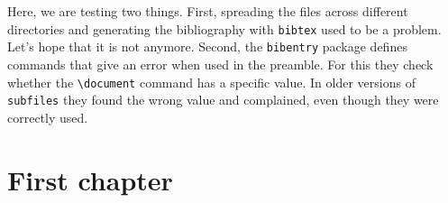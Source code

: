 \documentclass{report}
\begin{document}
Here, we are testing two things. First, spreading the files across
different directories and generating the bibliography with
\verb|bibtex| used to be a problem. Let's hope that it is not anymore.
Second, the \verb|bibentry| package defines commands that give an
error when used in the preamble. For this they check whether the
\verb|\document| command has a specific value. In older versions of
\verb|subfiles| they found the wrong value and complained, even though
they were correctly used.

\chapter{First chapter}

\end{document}

